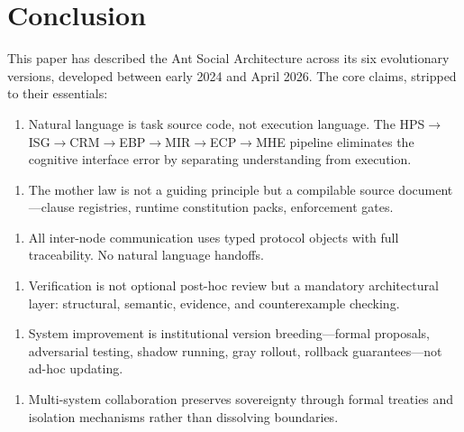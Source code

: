 \documentclass[12pt,a4paper]{article}
\begin{document}
\section{Conclusion}


This paper has described the Ant Social Architecture across its six evolutionary versions, developed between early 2024 and April 2026. The core claims, stripped to their essentials:

\begin{enumerate}
  \item Natural language is task source code, not execution language. The HPS$\rightarrow$ISG$\rightarrow$CRM$\rightarrow$EBP$\rightarrow$MIR$\rightarrow$ECP$\rightarrow$MHE pipeline eliminates the cognitive interface error by separating understanding from execution.
\end{enumerate}

\begin{enumerate}
  \item The mother law is not a guiding principle but a compilable source document---clause registries, runtime constitution packs, enforcement gates.
\end{enumerate}

\begin{enumerate}
  \item All inter-node communication uses typed protocol objects with full traceability. No natural language handoffs.
\end{enumerate}

\begin{enumerate}
  \item Verification is not optional post-hoc review but a mandatory architectural layer: structural, semantic, evidence, and counterexample checking.
\end{enumerate}

\begin{enumerate}
  \item System improvement is institutional version breeding---formal proposals, adversarial testing, shadow running, gray rollout, rollback guarantees---not ad-hoc updating.
\end{enumerate}

\begin{enumerate}
  \item Multi-system collaboration preserves sovereignty through formal treaties and isolation mechanisms rather than dissolving boundaries.
\end{enumerate}
\end{document}
